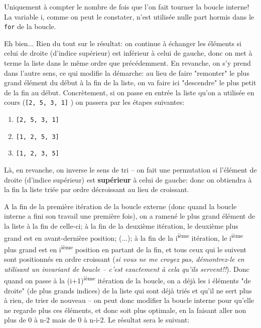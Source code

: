 \documentclass[12pt]{article}
\begin{document}
	\begin{MaReponse}
		\begin{alphenum}
			\item Uniquement à compter le nombre de fois que l'on fait tourner la boucle interne! La variable i, comme on peut le constater, n'est utilisée nulle part hormis dans le \texttt{for} de la boucle.
			\item Eh bien... Rien du tout sur le résultat: on continue à échanger les éléments si celui de droite (d'indice supérieur) est inférieur à celui de gauche, donc on met à terme la liste dans le même ordre que précédemment. En revanche, on s'y prend dans l'autre sens, ce qui modifie la démarche: au lieu de faire "remonter" le plus grand élément du début à la fin de la liste, on va faire ici "descendre" le plus petit de la fin au début. Concrètement, si on passe en entrée la liste qu'on a utilisée en cours (\texttt{[2, 5, 3, 1]} ) on passera par les étapes suivantes:
			\begin{enumerate}
				\item \texttt{[2, 5, 3, 1]}
				\item \texttt{[1, 2, 5, 3]}
				\item \texttt{[1, 2, 3, 5]}
			\end{enumerate}
			\item Là, en revanche, on inverse le sens de tri -- on fait une permutation si l'élément de droite (d'indice supérieur) est \textbf{supérieur} à celui de gauche: donc on obtiendra à la fin la liste triée par ordre décroissant au lieu de croissant.
			\item A la fin de la première itération de la boucle externe (donc quand la boucle interne a fini son travail une première fois), on a ramené le plus grand élément de la liste à la fin de celle-ci; à la fin de la deuxième itération, le deuxième plus grand est en avant-dernière position; (...); à la fin de la i\textsuperscript{ième} itération, le i\textsuperscript{ième} plus grand est en i\textsuperscript{ième} position en partant de la fin, et tous ceux qui le suivent sont positionnés en ordre croissant (\textit{si vous ne me croyez pas, démontrez-le en utilisant un invariant de boucle -- c'est exactement à cela qu'ils servent!!}). Donc quand on passe à la (i+1)\textsuperscript{ième} itération de la boucle, on a déjà les i éléments "de droite" (de plus grands indices) de la liste qui sont déjà triés et qu'il ne sert plus à rien, de trier de nouveau --  on peut donc modifier la boucle interne pour qu'elle ne regarde plus ces éléments, et donc soit plus optimale, en la faisant aller non plus de 0 à n-2 mais de 0 à n-i-2. Le résultat sera le suivant:
		\end{alphenum}
	\end{MaReponse}
	
\end{document}
